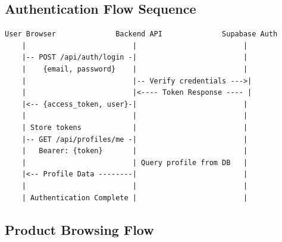 \documentclass[12pt,a4paper]{report}
\begin{document}
\subsection{Authentication Flow Sequence}

\begin{lstlisting}[language=text, caption=User Authentication Flow]
User Browser              Backend API              Supabase Auth
    |                         |                         |
    |-- POST /api/auth/login -|                         |
    |    {email, password}    |                         |
    |                         |-- Verify credentials --->|
    |                         |<---- Token Response ---- |
    |<-- {access_token, user}-|                         |
    |                         |                         |
    | Store tokens            |                         |
    |-- GET /api/profiles/me -|                         |
    |   Bearer: {token}       |                         |
    |                         | Query profile from DB   |
    |<-- Profile Data --------|                         |
    |                         |                         |
    | Authentication Complete |                         |
\end{lstlisting}

\subsection{Product Browsing Flow}
\end{document}
